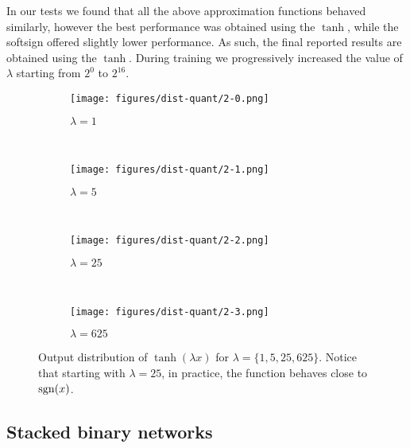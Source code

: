 \documentclass[10pt,twocolumn,letterpaper]{article}
\begin{document}
In our tests we found that all the above approximation functions behaved similarly, however the best performance was obtained using the $\tanh$, while the softsign offered slightly lower performance. As such, the final reported results are obtained using the $\tanh$. During training we progressively increased the value of $\lambda$ starting from $2^0$ to $2^{16}$. \begin{figure*}[!htbp]
    \begin{subfigure}[t]{0.24\textwidth}
    \centering
    \texttt{[image: figures/dist-quant/2-0.png]}
    \caption{$\lambda=1$}
    \label{fig:lambda-1}
    \end{subfigure}
    ~
    \begin{subfigure}[t]{0.24\textwidth}
    \centering
    \texttt{[image: figures/dist-quant/2-1.png]}
    \caption{$\lambda=5$}
    \label{fig:lambda-5}
    \end{subfigure}
    ~
    \begin{subfigure}[t]{0.24\textwidth}
    \centering
    \texttt{[image: figures/dist-quant/2-2.png]}
    \caption{$\lambda=25$}
    \label{fig:lambda-25}
    \end{subfigure}
    ~
    \begin{subfigure}[t]{0.24\textwidth}
    \centering
    \texttt{[image: figures/dist-quant/2-3.png]}
    \caption{$\lambda=625$}
    \label{fig:lambda-625}
    \end{subfigure}

    \caption{Output distribution of $\tanh(\lambda x)$ for $\lambda=\{1,5,25,625\}$. Notice that starting with $\lambda=25$, in practice, the function behaves close to $\operatorname{sgn}(x)$.}
    \label{fig:lambda-quantization}
\end{figure*}

\subsection{Stacked binary networks}\label{ssec:stacked-binary-nets}
\end{document}
